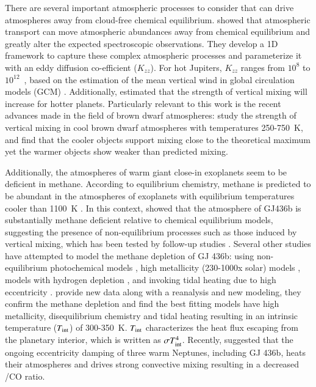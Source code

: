 There are several important atmospheric processes to consider that can drive atmospheres away from cloud-free chemical equilibrium. \citet{Zhang2018a} showed that atmospheric transport can move atmospheric abundances away from chemical equilibrium and greatly alter the expected spectroscopic observations. They develop a 1D framework to capture these complex atmospheric processes and parameterize it with an eddy diffusion co-efficient ($K_{zz}$). For hot Jupiters, $K_{zz}$ ranges from $10^8$ to $10^{12}$~\cmcms, based on the estimation of the mean vertical wind in global circulation models (GCM) \citep{Moses2011, Parmentier2013}. Additionally, \citet{Komacek2019} estimated that the strength of vertical mixing will increase for hotter planets. Particularly relevant to this work is the recent advances made in the field of brown dwarf atmospheres: \citet{Miles2020} study the strength of vertical mixing in cool brown dwarf atmospheres with temperatures 250-750~K, and find that the cooler objects support mixing close to the theoretical maximum yet the warmer objects show weaker than predicted mixing.

Additionally, the atmospheres of warm giant close-in exoplanets seem to be deficient in methane. According to equilibrium chemistry, methane is predicted to be abundant in the atmospheres of exoplanets with equilibrium temperatures cooler than 1100~K \citep{Madhusudhan2012}. In this context, \citep{Stevenson2010b} showed that the atmosphere of GJ436b is substantially methane deficient relative to chemical equilibrium models, suggesting the presence of non-equilibrium processes such as those induced by vertical mixing, which has been tested by follow-up studies \citep{Knutson2011, Lanotte2014}. Several other studies have attempted to model the methane depletion of GJ 436b: using non-equilibrium photochemical models \citep{Line2011}, high metallicity (230-1000x solar) models \citep{Moses2013}, models with hydrogen depletion \citep{Hu2015}, and invoking tidal heating due to high eccentricity \citep{Agundez2014}. \citet{Morley2017} provide new data along with a reanalysis and new modeling, they confirm the methane depletion and find the best fitting models have high metallicity, disequilibrium chemistry and tidal heating resulting in an intrinsic temperature ($T_{\rm int}$) of 300-350~K. $T_{\rm int}$ characterizes the heat flux escaping from the planetary interior, which is written as $\sigma T_{\rm int}^4$. Recently, \citet{Fortney2020} suggested that the ongoing eccentricity damping of three warm Neptunes, including GJ 436b, heats their atmospheres and drives strong convective mixing resulting in a decreased /CO ratio.

